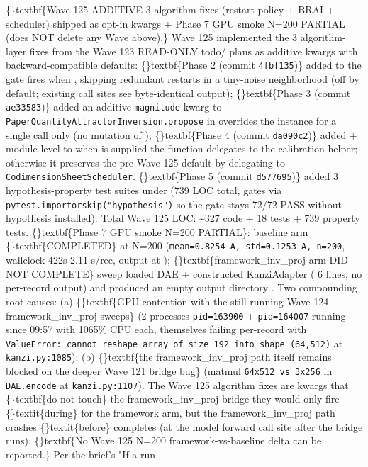 \documentclass{article}
\begin{document}
\{\}textbf\{Wave 125 ADDITIVE  3 algorithm fixes (restart policy + BRAI +  scheduler) shipped as opt-in kwargs + Phase 7 GPU smoke N=200 PARTIAL (does NOT delete any Wave above).\} Wave 125 implemented the 3 algorithm-layer fixes from the Wave 123 READ-ONLY todo/ plans as additive kwargs with backward-compatible defaults: \{\}textbf\{Phase 2 (commit \texttt{4fbf135})\} added  to   the gate fires when , skipping redundant restarts in a tiny-noise neighborhood (off by default; existing call sites see byte-identical output); \{\}textbf\{Phase 3 (commit \texttt{ae33583})\} added an additive \texttt{magnitude} kwarg to \texttt{PaperQuantityAttractorInversion.propose} in   overrides the instance  for a single call only (no mutation of ); \{\}textbf\{Phase 4 (commit \texttt{da090c2})\} added  + module-level  to   when  is supplied the function delegates to the calibration helper; otherwise it preserves the pre-Wave-125 default by delegating to \texttt{CodimensionSheetScheduler}. \{\}textbf\{Phase 5 (commit \texttt{d577695})\} added 3 hypothesis-property test suites under  (739 LOC total, gates via \texttt{pytest.importorskip("hypothesis")} so the gate stays 72/72 PASS without hypothesis installed). Total Wave 125 LOC: \textasciitilde{}327 code + 18 tests + 739 property tests. \{\}textbf\{Phase 7 GPU smoke N=200 PARTIAL\}: baseline arm \{\}textbf\{COMPLETED\} at N=200 (\texttt{mean=0.8254 A, std=0.1253 A, n=200}, wallclock 422s  2.11 s/rec, output at ); \{\}textbf\{framework\_inv\_proj arm DID NOT COMPLETE\}  sweep loaded DAE + constructed KanziAdapter ( 6 lines, no per-record output) and produced an empty output directory . Two compounding root causes: (a) \{\}textbf\{GPU contention with the still-running Wave 124 framework\_inv\_proj sweeps\} (2 processes \texttt{pid=163900} + \texttt{pid=164007} running since 09:57 with 1065\% CPU each, themselves failing per-record with \texttt{ValueError: cannot reshape array of size 192 into shape (64,512)} at \texttt{kanzi.py:1085}); (b) \{\}textbf\{the framework\_inv\_proj path itself remains blocked on the deeper Wave 121 bridge bug\} (matmul \texttt{64x512 vs 3x256} in \texttt{DAE.encode} at \texttt{kanzi.py:1107}). The Wave 125 algorithm fixes are kwargs that \{\}textbf\{do not touch\} the framework\_inv\_proj bridge  they would only fire \{\}textit\{during\}  for the framework arm, but the framework\_inv\_proj path crashes \{\}textit\{before\}  completes (at the model forward call site after the bridge runs). \{\}textbf\{No Wave 125 N=200 framework-vs-baseline delta can be reported.\} Per the brief's "If a run 
\end{document}
